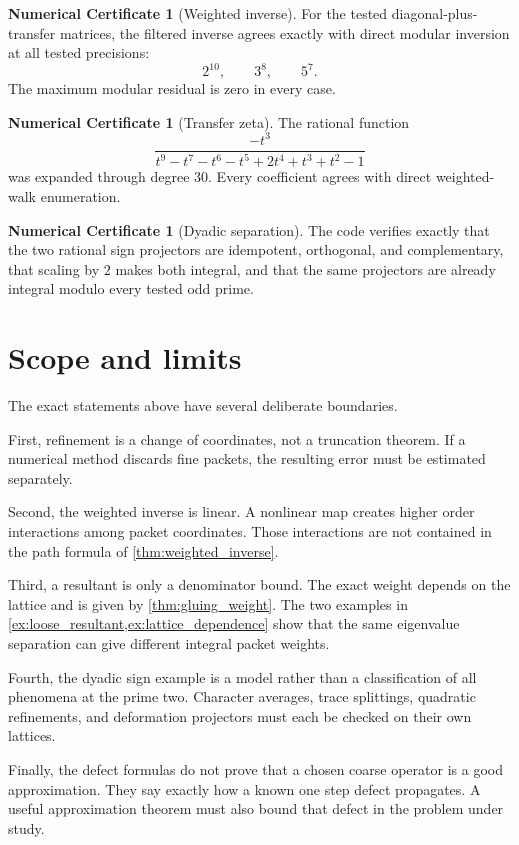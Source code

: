 \documentclass[11pt,a4paper]{article}
\theoremstyle{definition}
\theoremstyle{remark}
\theoremstyle{definition}\newtheorem{construction}[theorem]{Construction}\newtheorem{certificate}[theorem]{Numerical Certificate}
\theoremstyle{remark}\newtheorem{boundary}[theorem]{Boundary}
\begin{document}
\begin{certificate}[Weighted inverse]
For the tested diagonal-plus-transfer matrices, the filtered inverse agrees exactly with direct modular inversion at all tested precisions:
\[
2^{10},\qquad3^8,\qquad5^7.
\]
The maximum modular residual is zero in every case.
\end{certificate}

\begin{certificate}[Transfer zeta]
The rational function
\[
\frac{-t^3}{t^9-t^7-t^6-t^5+2t^4+t^3+t^2-1}
\]
was expanded through degree $30$. Every coefficient agrees with direct weighted-walk enumeration.
\end{certificate}

\begin{certificate}[Dyadic separation]
The code verifies exactly that the two rational sign projectors are idempotent, orthogonal, and complementary, that scaling by $2$ makes both integral, and that the same projectors are already integral modulo every tested odd prime.
\end{certificate}


\section{Scope and limits}\label{sec:limits}

The exact statements above have several deliberate boundaries.

First, refinement is a change of coordinates, not a truncation theorem.  If a numerical method discards fine packets, the resulting error must be estimated separately.

Second, the weighted inverse is linear.  A nonlinear map creates higher order interactions among packet coordinates.  Those interactions are not contained in the path formula of \cref{thm:weighted_inverse}.

Third, a resultant is only a denominator bound.  The exact weight depends on the lattice and is given by \cref{thm:gluing_weight}.  The two examples in \cref{ex:loose_resultant,ex:lattice_dependence} show that the same eigenvalue separation can give different integral packet weights.

Fourth, the dyadic sign example is a model rather than a classification of all phenomena at the prime two.  Character averages, trace splittings, quadratic refinements, and deformation projectors must each be checked on their own lattices.

Finally, the defect formulas do not prove that a chosen coarse operator is a good approximation.  They say exactly how a known one step defect propagates.  A useful approximation theorem must also bound that defect in the problem under study.
\end{document}

